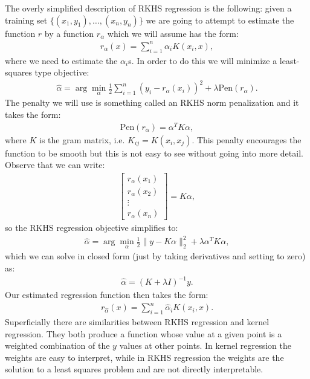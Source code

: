 \documentclass[twoside,12pt]{article}
\begin{document}
The overly simplified description of RKHS regression is the following: given a training set $\{(x_1,y_1),\ldots,(x_n,y_n)\}$ we are going to attempt to estimate the function $r$ by a function $r_{\alpha}$ which we will assume has the form:
\begin{align*}
r_{\alpha}(x) = \sum_{i=1}^n \alpha_i K(x_i,x),
\end{align*}
where we need to estimate the $\alpha_i$s. In order to do this we will minimize a least-squares type objective:
\begin{align*}
\widehat{\alpha} = \arg \min_{\alpha} \frac{1}{2} \sum_{i=1}^n (y_i - r_{\alpha}(x_i))^2 + \lambda \text{Pen}(r_{\alpha}).
\end{align*}
The penalty we will use is something called an RKHS norm penalization and it takes the form:
\begin{align*}
 \text{Pen}(r_{\alpha}) = \alpha^T K \alpha,
\end{align*}
where $K$ is the gram matrix, i.e. $K_{ij} = K(x_i,x_j)$. This penalty encourages the function to be smooth but this is not easy to see without going into more detail. Observe that we can write:
\begin{align*}
\left[ \begin{array}{c}
r_{\alpha}(x_1) \\
r_{\alpha}(x_2) \\
\vdots  \\
r_{\alpha}(x_n) \end{array}\right] = K\alpha,
\end{align*}
so the RKHS regression objective simplifies to:
\begin{align*}
\widehat{\alpha} = \arg \min_{\alpha} \frac{1}{2} \|y - K\alpha\|_2^2 + \lambda \alpha^T K \alpha,
\end{align*}
which we can solve in closed form (just by taking derivatives and setting to zero) as:
\begin{align*}
\widehat{\alpha} = (K + \lambda I)^{-1} y. 
\end{align*}
Our estimated regression function then takes the form:
\begin{align*}
r_{\widehat{\alpha}}(x) = \sum_{i=1}^n \widehat{\alpha}_i K(x_i,x).
\end{align*}
Superficially there are similarities between RKHS regression and kernel regression. They both produce a function whose value at a given point is a weighted combination of the $y$ values at other points. In kernel regression the weights are easy to interpret, while in RKHS regression the weights are the solution to a least squares problem and are not directly interpretable.
\end{document}
